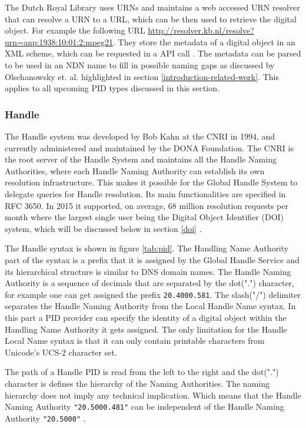 The Dutch Royal Library uses URNs and maintains a web accessed URN resolver that can resolve a URN to a URL, which can be then used to retrieve the digital object. For example the following URL \url{http://resolver.kb.nl/resolve?urn=anp:1938:10:01:2:mpeg21}. 
They store the metadata of a digital object in an XML scheme, which can be requested in a API call \cite{kb-urn}. The metadata can be parsed to be used in an NDN name to fill in possible naming gaps as discussed by Olschanowsky et. al. \cite{ndn-clim} highlighted in section \ref{introduction-related-work}. This applies to all upcoming PID types discussed in this section.

\subsubsection{Handle}
The Handle system was developed by Bob Kahn at the CNRI in 1994, and currently administered and maintained by the DONA Foundation. The CNRI is the root server of the Handle System and maintains all the Handle Naming Authorities, where each Handle Naming Authority can establish its own resolution infrastructure. This makes it possible for the Global Handle System to delegate queries for Handle resolution. 
Its main functionalities are specified in RFC 3650. In 2015 it supported, on average, 68 million resolution requests per month where the largest single user being the Digital Object Identifier (DOI) system, which will be discussed below in section \ref{doi} \cite{hdl-us}. 

The Handle syntax is shown in figure \ref{tab:pid}. The Handling Name Authority part of the syntax is a prefix that it is assigned by the Global Handle
Service and its hierarchical structure is similar to DNS domain names. The Handle Naming Authority is a sequence of decimals that are separated by the
dot(".") character, for example one can get assigned the prefix \texttt{20.4000.581}. 
The slash("/") delimiter separates the Handle Naming Authority from the Local Handle Name syntax. In this part a PID provider can specify the identity of a digital object within the Handling Name Authority it gets assigned. 
The only limitation for the Handle Local Name syntax is that it can only contain printable characters from Unicode's
UCS-2 character set.

The path of a Handle PID is read from the left to the right and the dot(".") character is defines the hierarchy of the Naming Authorities. The naming hierarchy
does not imply any technical implication. Which means that the Handle Naming Authority \texttt{"20.5000.481"} can be independent of the Handle Naming Authority \texttt{"20.5000"} \cite{icn-bd}.

